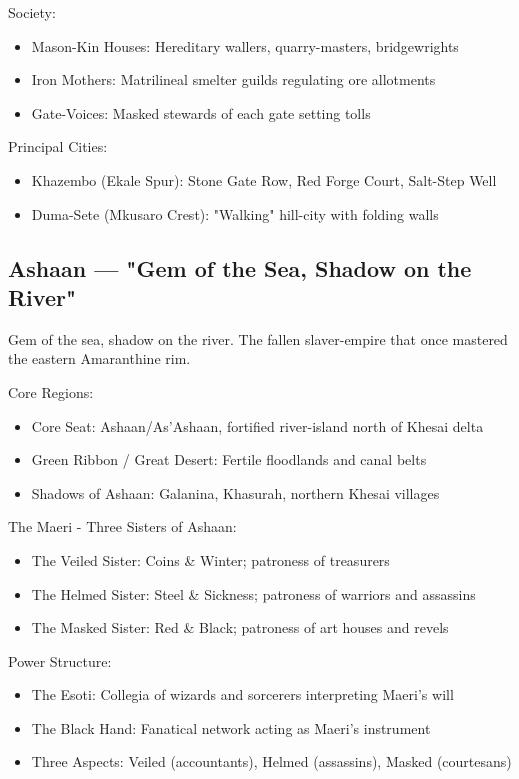 Society:
\begin{itemize}
    \item Mason-Kin Houses: Hereditary wallers, quarry-masters, bridgewrights
    \item Iron Mothers: Matrilineal smelter guilds regulating ore allotments
    \item Gate-Voices: Masked stewards of each gate setting tolls
\end{itemize}

Principal Cities:
\begin{itemize}
    \item Khazembo (Ekale Spur): Stone Gate Row, Red Forge Court, Salt-Step Well
    \item Duma-Sete (Mkusaro Crest): "Walking" hill-city with folding walls
\end{itemize}

\subsection{Ashaan — "Gem of the Sea, Shadow on the River"}
\label{sec:ashaan}

Gem of the sea, shadow on the river. The fallen slaver-empire that once mastered the eastern Amaranthine rim.

Core Regions:
\begin{itemize}
    \item Core Seat: Ashaan/As'Ashaan, fortified river-island north of Khesai delta
    \item Green Ribbon / Great Desert: Fertile floodlands and canal belts
    \item Shadows of Ashaan: Galanina, Khasurah, northern Khesai villages
\end{itemize}

The Maeri - Three Sisters of Ashaan:
\begin{itemize}
    \item The Veiled Sister: Coins \& Winter; patroness of treasurers
    \item The Helmed Sister: Steel \& Sickness; patroness of warriors and assassins
    \item The Masked Sister: Red \& Black; patroness of art houses and revels
\end{itemize}

Power Structure:
\begin{itemize}
    \item The Esoti: Collegia of wizards and sorcerers interpreting Maeri's will
    \item The Black Hand: Fanatical network acting as Maeri's instrument
    \item Three Aspects: Veiled (accountants), Helmed (assassins), Masked (courtesans)
\end{itemize}

